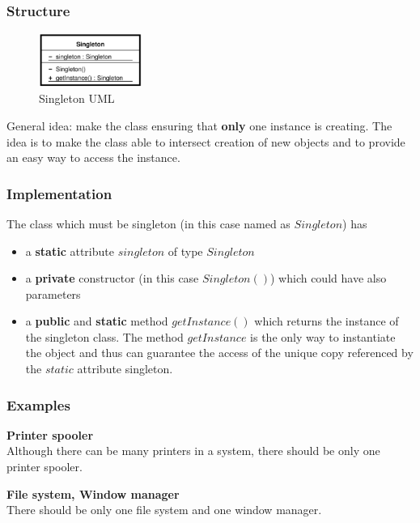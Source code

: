 \documentclass{article}
\begin{document}
\subsubsection{Structure}
\begin{figure}[h!]
  \centering
    \includegraphics[width=0.3\textwidth]{Img/SingletonUML.png}
     \caption{Singleton UML}
     \label{SingletonUML}
\end{figure}
General idea: make the class ensuring that \textbf{only} one instance is creating. The idea is to make the class able to intersect creation of new objects and to provide an easy way to access the instance.

\subsubsection{Implementation}
The class which must be singleton (in this case named as $Singleton$) has
\begin{itemize}
\item a \textbf{static} attribute $singleton$ of type $Singleton$
\item a \textbf{private} constructor (in this case $Singleton()$) which could have also parameters
\item a \textbf{public} and \textbf{static} method $getInstance()$ which returns the instance of the singleton class. The method $getInstance$ is the only way to instantiate the object and thus can guarantee the access of the unique copy referenced by the $static$ attribute singleton. 
\end{itemize}


\subsubsection{Examples}
\textbf{Printer spooler}\\
 Although there can be many printers in a system, there should be only one printer spooler.
 
 \textbf{File system, Window manager}\\
 There should be only one file system and one window manager.
 
\end{document}

